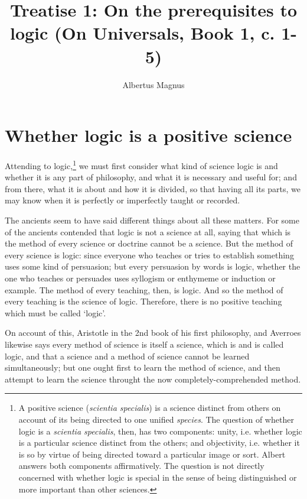 \documentclass[]{article}
\title{Treatise 1: On the prerequisites to logic (On Universals, Book 1, c. 1-5)}
\author{Albertus Magnus}
\begin{document}
\maketitle

\begin{abstract}

\end{abstract}

\section{Whether logic is a positive science}

Attending to logic,\footnote{A positive science (\textit{scientia specialis}) is a science distinct from others on account of its being directed to one unified \textit{species}. The question of whether logic is a \textit{scientia specialis}, then, has two components: unity, i.e. whether logic is a particular science distinct from the others; and objectivity, i.e. whether it is so by virtue of being directed toward a particular image or sort. Albert answers both components affirmatively. The question is not directly concerned with whether logic is special in the sense of being distinguished or more important than other sciences.} we must first consider what kind of science logic is and whether it is any part of philosophy, and what it is necessary and useful for; and from there, what it is about and how it is divided, so that having all its parts, we may know when it is perfectly or imperfectly taught or recorded.

The ancients seem to have said different things about all these matters. For some of the ancients contended that logic is not a science at all, saying that which is the method of every science or doctrine cannot be a science. But the method of every science is logic: since everyone who teaches or tries to establish something uses some kind of persuasion; but every persuasion by words is logic, whether the one who teaches or persuades uses syllogism or  enthymeme or induction or example. The method of every teaching, then, is logic. And so the method of every teaching is the science of logic. Therefore, there is no positive teaching which must be called `logic'.

On account of this, Aristotle in the 2nd book of his first philosophy, and Averroes likewise says every method of science is itself a science, which is and is called logic, and that a science and a method of science cannot be learned simultaneously; but one ought first to learn the method of science, and then attempt to learn the science throught the now completely-comprehended method. 
\end{document}
